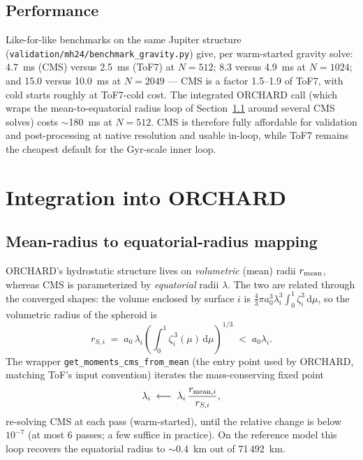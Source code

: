 \documentclass{aastex631}
\newcommand{\dd}{\mathrm{d}}
\begin{document}
\subsection{Performance}

Like-for-like benchmarks on the same Jupiter structure
(\texttt{validation/mh24/benchmark\_gravity.py}) give, per warm-started
gravity solve: 4.7~ms (CMS) versus 2.5~ms (ToF7) at $N=512$; 8.3 versus
4.9~ms at $N=1024$; and 15.0 versus 10.0~ms at $N=2049$ --- CMS is a
factor 1.5--1.9 of ToF7, with cold starts roughly at ToF7-cold cost.
The integrated ORCHARD call (which wraps the mean-to-equatorial radius
loop of Section~\ref{sec:meanradius} around several CMS solves) costs
$\sim$180~ms at $N=512$.  CMS is therefore fully affordable for
validation and post-processing at native resolution and usable in-loop,
while ToF7 remains the cheapest default for the Gyr-scale inner loop.

\section{Integration into ORCHARD}\label{sec:integration}

\subsection{Mean-radius to equatorial-radius mapping}
\label{sec:meanradius}

ORCHARD's hydrostatic structure lives on \emph{volumetric} (mean) radii
$r_{\rm mean}$, whereas CMS is parameterized by \emph{equatorial} radii
$\lambda$.  The two are related through the converged shapes: the
volume enclosed by surface $i$ is
$\tfrac{4}{3}\pi a_0^3 \lambda_i^3 \int_0^1 \zeta_i^3\,\dd\mu$, so the
volumetric radius of the spheroid is
\begin{equation}
r_{S,i} \;=\; a_0\,\lambda_i
\left( \int_0^1 \zeta_i^{\,3}(\mu)\,\dd\mu \right)^{1/3}
\;<\; a_0 \lambda_i .
\label{eq:rS}
\end{equation}
The wrapper \texttt{get\_moments\_cms\_from\_mean} (the entry point used
by ORCHARD, matching ToF's input convention) iterates the
mass-conserving fixed point
\begin{equation}
\lambda_i \;\longleftarrow\; \lambda_i \,
\frac{r_{{\rm mean},i}}{r_{S,i}},
\label{eq:lamloop}
\end{equation}
re-solving CMS at each pass (warm-started), until the relative change is
below $10^{-7}$ (at most 6 passes; a few suffice in practice).  On the
\citet{MilitzerHubbard2024} reference model this loop recovers the
equatorial radius to $\sim$0.4~km out of 71\,492~km.
\end{document}
